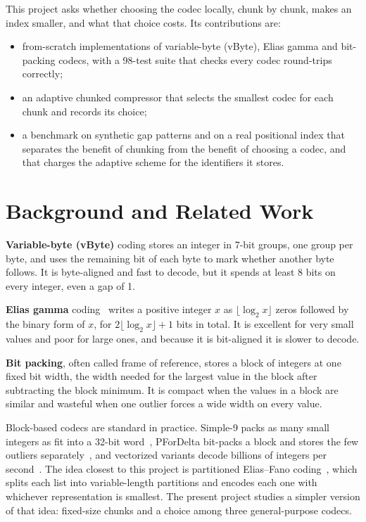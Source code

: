 \documentclass[11pt]{article}
\begin{document}
This project asks whether choosing the codec locally, chunk by chunk, makes an index smaller, and
what that choice costs. Its contributions are:
\begin{itemize}
  \item from-scratch implementations of variable-byte (vByte), Elias gamma and bit-packing codecs,
        with a 98-test suite that checks every codec round-trips correctly;
  \item an adaptive chunked compressor that selects the smallest codec for each chunk and records its
        choice;
  \item a benchmark on synthetic gap patterns and on a real positional index that separates the
        benefit of chunking from the benefit of choosing a codec, and that charges the adaptive scheme
        for the identifiers it stores.
\end{itemize}

\section{Background and Related Work}

\textbf{Variable-byte (vByte)} coding stores an integer in 7-bit groups, one group per byte, and uses
the remaining bit of each byte to mark whether another byte follows. It is byte-aligned and fast to
decode, but it spends at least 8 bits on every integer, even a gap of 1.

\textbf{Elias gamma} coding~\cite{elias1975} writes a positive integer $x$ as $\lfloor\log_2 x\rfloor$
zeros followed by the binary form of $x$, for $2\lfloor\log_2 x\rfloor + 1$ bits in total. It is
excellent for very small values and poor for large ones, and because it is bit-aligned it is slower
to decode.

\textbf{Bit packing}, often called frame of reference, stores a block of integers at one fixed bit
width, the width needed for the largest value in the block after subtracting the block minimum. It
is compact when the values in a block are similar and wasteful when one outlier forces a wide width
on every value.

Block-based codecs are standard in practice. Simple-9 packs as many small integers as fit into a
32-bit word~\cite{anh2005}, PForDelta bit-packs a block and stores the few outliers
separately~\cite{zukowski2006}, and vectorized variants decode billions of integers per
second~\cite{lemire2015}. The idea closest to this project is partitioned Elias--Fano
coding~\cite{ottaviano2014}, which splits each list into variable-length partitions and encodes each
one with whichever representation is smallest. The present project studies a simpler version of
that idea: fixed-size chunks and a choice among three general-purpose codecs.
\end{document}
